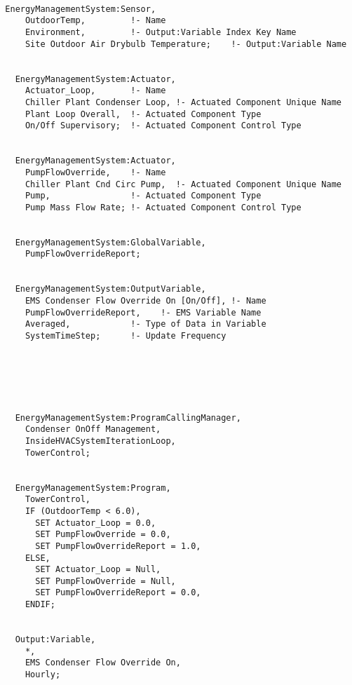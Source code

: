 \begin{lstlisting}

  EnergyManagementSystem:Sensor,
      OutdoorTemp,         !- Name
      Environment,         !- Output:Variable Index Key Name
      Site Outdoor Air Drybulb Temperature;    !- Output:Variable Name


    EnergyManagementSystem:Actuator,
      Actuator_Loop,       !- Name
      Chiller Plant Condenser Loop, !- Actuated Component Unique Name
      Plant Loop Overall,  !- Actuated Component Type
      On/Off Supervisory;  !- Actuated Component Control Type


    EnergyManagementSystem:Actuator,
      PumpFlowOverride,    !- Name
      Chiller Plant Cnd Circ Pump,  !- Actuated Component Unique Name
      Pump,                !- Actuated Component Type
      Pump Mass Flow Rate; !- Actuated Component Control Type


    EnergyManagementSystem:GlobalVariable,
      PumpFlowOverrideReport;


    EnergyManagementSystem:OutputVariable,
      EMS Condenser Flow Override On [On/Off], !- Name
      PumpFlowOverrideReport,    !- EMS Variable Name
      Averaged,            !- Type of Data in Variable
      SystemTimeStep;      !- Update Frequency






    EnergyManagementSystem:ProgramCallingManager,
      Condenser OnOff Management,
      InsideHVACSystemIterationLoop,
      TowerControl;


    EnergyManagementSystem:Program,
      TowerControl,
      IF (OutdoorTemp < 6.0),
        SET Actuator_Loop = 0.0,
        SET PumpFlowOverride = 0.0,
        SET PumpFlowOverrideReport = 1.0,
      ELSE,
        SET Actuator_Loop = Null,
        SET PumpFlowOverride = Null,
        SET PumpFlowOverrideReport = 0.0,
      ENDIF;


    Output:Variable,
      *,
      EMS Condenser Flow Override On,
      Hourly;
\end{lstlisting}
